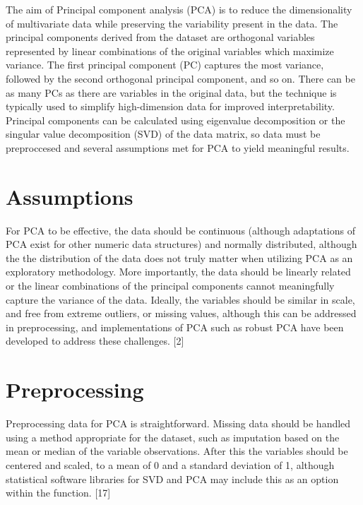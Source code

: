 \documentclass[
  letterpaper,
  DIV=11,
  numbers=noendperiod]{scrreprt}
\begin{document}
The aim of Principal component analysis (PCA) is to reduce the
dimensionality of multivariate data while preserving the variability
present in the data. The principal components derived from the dataset
are orthogonal variables represented by linear combinations of the
original variables which maximize variance. The first principal
component (PC) captures the most variance, followed by the second
orthogonal principal component, and so on. There can be as many PCs as
there are variables in the original data, but the technique is typically
used to simplify high-dimension data for improved interpretability.
Principal components can be calculated using eigenvalue decomposition or
the singular value decomposition (SVD) of the data matrix, so data must
be preproccesed and several assumptions met for PCA to yield meaningful
results.

\hypertarget{assumptions}{%
\section{Assumptions}\label{assumptions}}

For PCA to be effective, the data should be continuous (although
adaptations of PCA exist for other numeric data structures) and normally
distributed, although the the distribution of the data does not truly
matter when utilizing PCA as an exploratory methodology. More
importantly, the data should be linearly related or the linear
combinations of the principal components cannot meaningfully capture the
variance of the data. Ideally, the variables should be similar in scale,
and free from extreme outliers, or missing values, although this can be
addressed in preprocessing, and implementations of PCA such as robust
PCA have been developed to address these challenges. {[}2{]}

\hypertarget{preprocessing}{%
\section{Preprocessing}\label{preprocessing}}

Preprocessing data for PCA is straightforward. Missing data should be
handled using a method appropriate for the dataset, such as imputation
based on the mean or median of the variable observations. After this the
variables should be centered and scaled, to a mean of 0 and a standard
deviation of 1, although statistical software libraries for SVD and PCA
may include this as an option within the function. {[}17{]}
\end{document}
